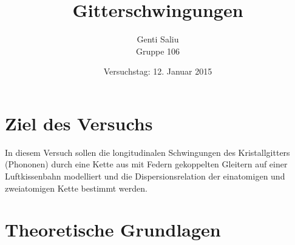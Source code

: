 \documentclass[a4paper,titlepage]{scrartcl}
\title{Gitterschwingungen}
\author{Genti Saliu\\Gruppe 106}
\date{Versuchstag: 12. Januar 2015}
\numberwithin{equation}{section}
\begin{document}
	\begin{titlepage}
		\maketitle
		\thispagestyle{empty}
	\end{titlepage}
	
\newpage
{}
\tableofcontents

\newpage
{}

\section{Ziel des Versuchs}
In diesem Versuch sollen die longitudinalen Schwingungen des Kristallgitters (Phononen) durch eine Kette aus mit Federn gekoppelten Gleitern auf einer Luftkissenbahn modelliert und die Dispersionsrelation der einatomigen und zweiatomigen Kette bestimmt werden.
\section{Theoretische Grundlagen}
\end{document}
